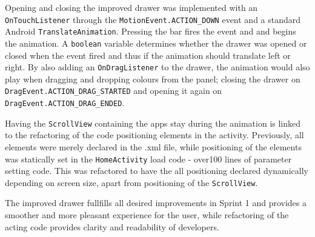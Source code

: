 Opening and closing the improved drawer was implemented with an \lstinline{OnTouchListener} through the \lstinline{MotionEvent.ACTION_DOWN} event and a standard Android \lstinline{TranslateAnimation}.
Pressing the bar fires the event and and begins the animation.
A \lstinline{boolean} variable determines whether the drawer was opened or closed when the event fired and thus if the animation should translate left or right.
By also adding an \lstinline{OnDragListener} to the drawer, the animation would also play when dragging and dropping colours from the panel; closing the drawer on \lstinline{DragEvent.ACTION_DRAG_STARTED} and opening it again on \lstinline{DragEvent.ACTION_DRAG_ENDED}.

Having the \lstinline{ScrollView} containing the apps stay during the animation is linked to the refactoring of the code positioning elements in the activity.
Previously, all elements were merely declared in the .xml file, while positioning of the elements was statically set in the \lstinline{HomeActivity} load code - over100 lines of parameter setting code.
This was refactored to have the all positioning declared dynamically depending on screen size, apart from positioning of the \lstinline{ScrollView}.

The improved drawer fullfills all desired improvements in Sprint 1 and provides a smoother and more pleasant experience for the user, while refactoring of the acting code provides clarity and readability of developers.
